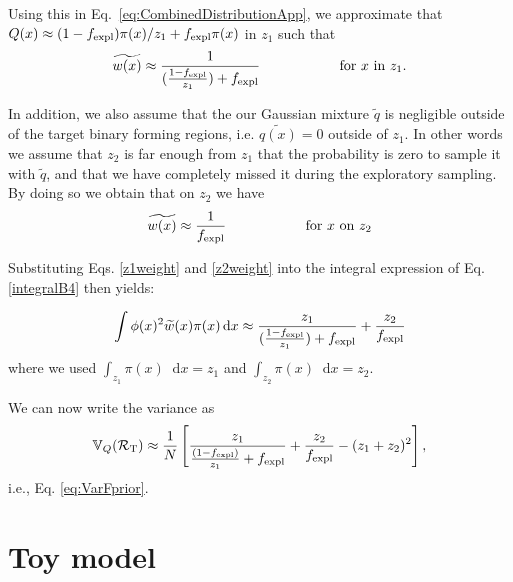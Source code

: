 \documentclass[a4paper,fleqn,usenatbib,useAMS,usedcolumn]{mnras}
\newcommand\rate{\mathcal{R}}
\newcommand*\dif{\mathop{}\!\mathrm{d}}
\begin{document}
Using this in Eq.~\ref{eq:CombinedDistributionApp}, we approximate that $Q(x) \approx   (1-f_{\rm{expl}}) \pi(x)/z_1  + f_{\rm{expl}} \pi(x)$ in $z_1$ such that
\begin{align}
	\widetilde{w(x)} \approx \frac{1}{(\frac{1-f_{\rm{expl}}}{z_1}) + f_{\rm{expl}}}  \hspace{2cm} \text{for }x \text{ in } z_1.
	\label{z1weight}
\end{align}

In addition, we also assume that the our Gaussian mixture $\widetilde{q}$ is negligible outside of the target binary forming regions, i.e. $\widetilde{q(x)} = 0 $ outside of $z_1$. In other words we assume that $z_2$ is far enough from $z_1$ that the probability is zero to sample it with $\widetilde{q}$, and that we have completely missed it during the exploratory sampling. By doing so we obtain that on $z_2$ we have
\begin{align}
	\widetilde{w(x)} \approx \frac{1}{f_{\rm{expl}}}  \hspace{2cm} \text{for }x \text{ on } z_2
	\label{z2weight}
\end{align}

Substituting  Eqs. \ref{z1weight} and \ref{z2weight} into the integral expression of Eq. \ref{integralB4}  then yields: 

\begin{align}
	 \int \phi(x)^2 \widetilde{w}(x) \pi(x)  \dif x  \approx \frac{z_1}{(\frac{1-f_{\rm{expl}}}{z_1}) + f_{\rm{expl}}} + \frac{z_2}{f_{\rm{expl}}}
	  \label{integralB5}
\end{align}
where we used $\int_{z_1} \pi(x) \dif x = z_1$ and  $\int_{z_2} \pi(x) \dif x = z_2$.

We can now write the variance as
\begin{equation}
\mathbb{V}_Q(\rate_{\text{T}}) \approx \frac{1}{N} \left[  \frac{z_1}{\frac{(1-f_{\rm{expl}})}{z_1} + f_{\rm{expl}}}  + \frac{z_2}{f_{\rm{expl}}} - (z_1 + z_2)^2    \right],	
	\label{eq:VarFpriorApp}
\end{equation} 
i.e., Eq. \ref{eq:VarFprior}.
 
\section{Toy model}
\label{app:toymodel}
\end{document}
